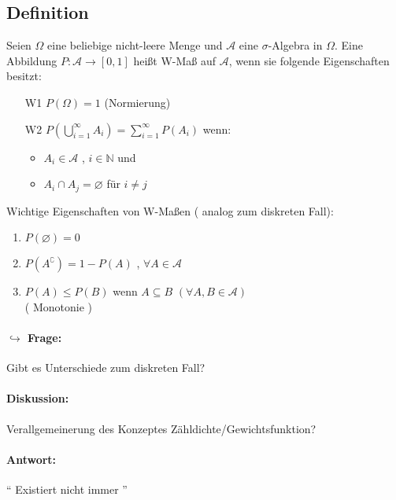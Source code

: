 \documentclass[12pt,a4paper]{article}
\begin{document}
	
	\subsection{Definition }
	Seien $\Omega$ eine beliebige nicht-leere Menge und $\mathcal{A}$ eine $\sigma$-Algebra in $\Omega$. Eine Abbildung $P:\mathcal{A}\rightarrow[0,1]$ heißt W-Maß auf $\mathcal{A}$, wenn sie folgende Eigenschaften besitzt:
	\begin{itemize}
		\item[W1] $P(\Omega) = 1$ \quad (Normierung)
		\item[W2] $\displaystyle P\left(\bigcup_{i=1}^{\infty} A_i\right) = \sum_{i=1}^{\infty} P(A_i)$ wenn: 
		\begin{itemize}
			\item $A_i\in\mathcal{A}$ , $i\in\mathbb{N}$ und
			\item $A_i\cap A_j =\varnothing$ für $i\neq j$
		\end{itemize}
	\end{itemize}
	Wichtige Eigenschaften von W-Maßen ( analog zum diskreten Fall):
	\begin{enumerate}[i]
		\item $P(\varnothing)=0$
		\item $P(A^\complement )= 1-P(A)$ , $\forall A\in \mathcal{A}$
		\item $P(A)\leq P(B)$ wenn $A\subseteq B$ \quad $(\forall A,B\in\mathcal{A})$\\
		( Monotonie )
	\end{enumerate}
	\paragraph{$\hookrightarrow$ Frage:}
	Gibt es Unterschiede zum diskreten Fall?
	\paragraph{Diskussion:}
	Verallgemeinerung des Konzeptes Zähldichte/Gewichtsfunktion?
	\paragraph{Antwort:}
	`` Existiert nicht immer ''
	
\end{document}
